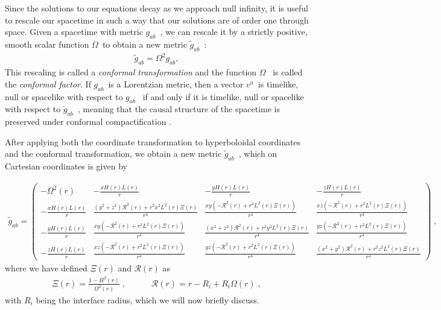 Since the solutions to our equations decay as we approach null infinity, it is useful to rescale our spacetime in such a way that our solutions are of order one through space. Given a spacetime with metric $g_{ab}$~, we can rescale it by a strictly positive, smooth scalar function $\Omega$~to obtain a new metric $\tilde{g}_{ab}$~:
%
\begin{align}
    \tilde{g}_{ab} = \Omega^2 g_{ab},
\end{align}
%
This rescaling is called a \textit{conformal transformation} and the function $\Omega$~ is called the \textit{conformal factor}. If $g_{ab}$~is a Lorentzian metric, then a vector $v^a$~is timelike, null or spacelike with respect to $g_{ab}$~ if and only if it is timelike, null or spacelike with respect to $\tilde{g}_{ab}$~, meaning that the causal structure of the spacetime is preserved under conformal compactification \cite{wald:1984}. 

After applying both the coordinate transformation to hyperboloidal coordinates and the conformal transformation, we obtain a new metric $\tilde{g}_{ab}$~, which on Cartesian coordinates is given by

\begin{align}
    \tilde{g}_{ab} = 
    \begin{pmatrix}
        -\Omega^2(r) & -\frac{x H(r) L(r)}{r} & -\frac{y H(r) L(r)}{r} & -\frac{z H(r) L(r)}{r} \\
        -\frac{x H(r) L(r)}{r} & \frac{(y^2 + z^2) \mathcal{R}^2(r) + r^2 x^2 L^2(r) \Xi(r)}{r^4} & \frac{x y (-\mathcal{R}^2(r) + r^2 L^2(r) \Xi(r))}{r^4} & \frac{x z (-\mathcal{R}^2(r) + r^2 L^2(r) \Xi(r))}{r^4} \\
        -\frac{y H(r) L(r)}{r} & \frac{x y (-\mathcal{R}^2(r) + r^2 L^2(r) \Xi(r))}{r^4} & \frac{(x^2 + z^2) \mathcal{R}^2(r) + r^2 y^2 L^2(r) \Xi(r)}{r^4} & \frac{y z (-\mathcal{R}^2(r) + r^2 L^2(r) \Xi(r))}{r^4} \\
        -\frac{z H(r) L(r)}{r} & \frac{x z (-\mathcal{R}^2(r) + r^2 L^2(r) \Xi(r))}{r^4} & \frac{y z (-\mathcal{R}^2(r) + r^2 L^2(r) \Xi(r))}{r^4} & \frac{(x^2 + y^2) \mathcal{R}^2(r) + r^2 z^2 L^2(r) \Xi(r)}{r^4}
    \end{pmatrix} \; ,
\end{align}
%
where we have defined $\Xi(r)$ and $\mathcal{R}(r)$ as
%
\begin{align}
    \Xi(r) = \frac{1 - H^2(r)}{\Omega^2(r)} \; , \quad \quad \quad \mathcal{R}(r) = r - R_i + R_i \Omega(r) \; ,
\end{align}
%
with $R_i$ being the interface radius, which we will now briefly discuss.

